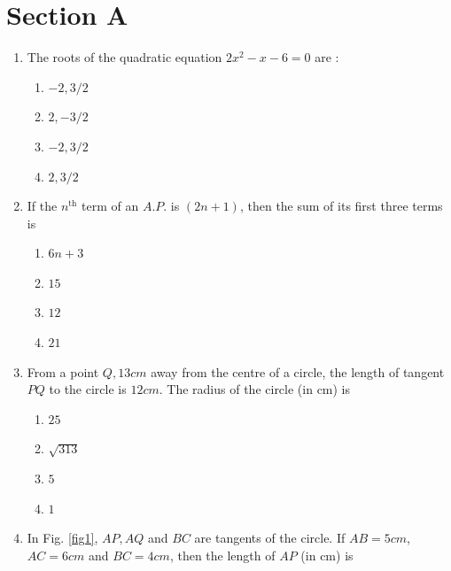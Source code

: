 \documentclass[journal,12pt,twocolumn]{IEEEtran}
\renewcommand\thesection{\arabic{section}}
\begin{document}
\section{Section A}
\renewcommand{\theequation}{\theenumi}
\begin{enumerate}[label=\thesection.\arabic*.,ref=\thesection.\theenumi]
\item The roots of the  quadratic equation $2x^2-x-6=0$ are :
 \begin{enumerate}
    \item $-2,3/2$\\
    \item $2, -3/2$\\
    \item $-2, 3/2$\\
    \item $2, 3/2$\\
 \end{enumerate} 
\item If the  $n^{\text{th}}$ term of an $A.P.$ is $(2n+ 1)$, then the sum of its first three terms is
 \begin{enumerate}
    \item $6n + 3$\\
    \item $15$ \\
    \item $12$\\
    \item $21$ \\
 \end{enumerate}
\item From a point $Q, 13 cm$ away from the centre of a circle, the length of tangent $PQ$ to the circle is $12 cm$. The radius of the circle (in cm)
is \\
 \begin{enumerate}
    \item $25$\\
    \item $\sqrt{313}$\\
    \item $5$\\
    \item $1$ \\
 \end{enumerate}
\item In Fig. \ref{fig1}, $AP, AQ$ and $BC$ are tangents of the circle. If $AB=5cm$, $AC=6cm$ and $BC=4 cm$, then the length of $AP$ (in cm) is \\

\end{enumerate}
\end{document}
